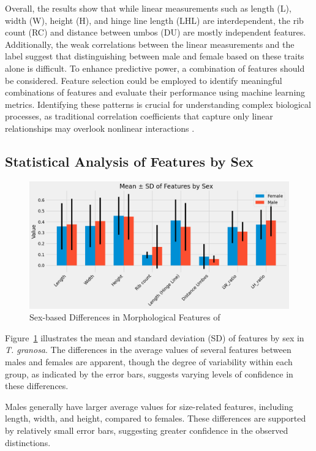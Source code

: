 Overall, the results show that while linear measurements such as length (L), width (W), height (H), and hinge line length (LHL) are interdependent, the rib count (RC) and distance between umbos (DU) are mostly independent features. Additionally, the weak correlations between the linear measurements and the label suggest that distinguishing between male and female \Tgranosa based on these traits alone is difficult. To enhance predictive power, a combination of features should be considered. Feature selection could be employed to identify meaningful combinations of features and evaluate their performance using machine learning metrics. Identifying these patterns is crucial for understanding complex biological processes, as traditional correlation coefficients that capture only linear relationships may overlook nonlinear interactions \cite{pividori2024}.


\subsection{Statistical Analysis of \Tgranosa Features by Sex}

\begin{figure}[!htbp]
	\centering
	\includegraphics[width=1.0\textwidth]{figures/eda.png}
	\caption{Sex-based Differences in Morphological Features of \Tgranosa}
	\label{fig:eda}
\end{figure}

Figure~\ref{fig:eda} illustrates the mean and standard deviation (SD) of features by sex in \textit{T. granosa}. The differences in the average values of several features between males and females are apparent, though the degree of variability within each group, as indicated by the error bars, suggests varying levels of confidence in these differences.

Males generally have larger average values for size-related features, including length, width, and height, compared to females. These differences are supported by relatively small error bars, suggesting greater confidence in the observed distinctions.

